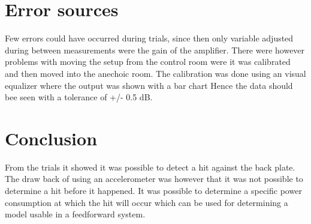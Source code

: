 \section{Error sources}

Few errors could have occurred during trials, since then only variable adjusted during between measurements were the gain of the amplifier. There were however problems with moving the setup from the control room were it was calibrated and then moved into the anechoic room. The calibration was done using an visual equalizer where the output was shown with a bar chart Hence the data should bee seen with a tolerance of +/- 0.5 dB.

\section{Conclusion}
From the trials it showed it was possible to detect a hit against the back plate. The draw back of using an accelerometer was however that it was not possible to determine a hit before it happened. It was possible to determine a specific power consumption at which the hit will occur which can be used for determining a model usable in a feedforward system.
